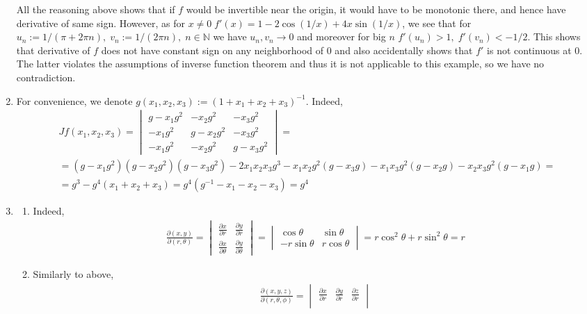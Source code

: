 \documentclass[8pt]{article} %
\begin{document}
\begin{enumerate}
{		All the reasoning above shows that if $f$ would be invertible near the origin, it would have to be monotonic there, and hence have derivative of same sign.
		However, as for $x\neq 0\;f'(x)=1-2\cos (1/x)+4x\sin(1/x)$, we see that for $u_n:=1/(\pi+2\pi n),\;v_n:=1/(2\pi n),\;n\in\mathbb{N}$ we have 
		$u_n,v_n\to 0$ and moreover for big $n$ $f'(u_n)>1,\;f'(v_n)<-1/2$. This shows that derivative of $f$ does not have constant sign on any neighborhood of $0$
		and also accidentally shows that $f'$ is not continuous at $0$. The latter violates the assumptions of inverse function theorem and thus it is not applicable
		to this example, so we have no contradiction.
		}
	\item{For convenience, we denote $g(x_1,x_2,x_3):=(1+x_1+x_2+x_3)^{-1}$. Indeed,
		\begin{gather*}
			Jf(x_1,x_2,x_3)=\begin{vmatrix}g-x_1g^2&-x_2g^2&-x_3g^2\\-x_1g^2&g-x_2g^2&-x_3g^2\\-x_1g^2&-x_2g^2&g-x_3g^2\end{vmatrix}=\\
				=(g-x_1g^2)(g-x_2g^2)(g-x_3g^2)-2x_1x_2x_3g^3-x_1x_2g^2(g-x_3g)-x_1x_3g^2(g-x_2g)-x_2x_3g^2(g-x_1g)=\\
				=g^3-g^4(x_1+x_2+x_3)=g^4(g^{-1}-x_1-x_2-x_3)=g^4
		\end{gather*}
		}
	\item{\begin{enumerate}[label=(\alph*)]
			\item{Indeed,
			\begin{gather*}
				\frac{\partial(x,y)}{\partial(r,\theta)}=
				\begin{vmatrix}\frac{\partial x}{\partial r}&\frac{\partial y}{\partial r}\\\frac{\partial x}{\partial\theta}&
					\frac{\partial y}{\partial\theta}\end{vmatrix}=
				\begin{vmatrix}\cos\theta&\sin\theta\\-r\sin\theta&r\cos\theta\end{vmatrix}=r\cos^2\theta+r\sin^2\theta
					=r
			\end{gather*}
				}
			\item{Similarly to above,
			\begin{gather*}
				\frac{\partial(x,y,z)}{\partial(r,\theta,\phi)}=
				\begin{vmatrix}
					\frac{\partial x}{\partial r}&\frac{\partial y}{\partial r}&\frac{\partial z}{\partial r}\\

\end{vmatrix}
\end{gather*}}
\end{enumerate}}
\end{enumerate}
\end{document}
